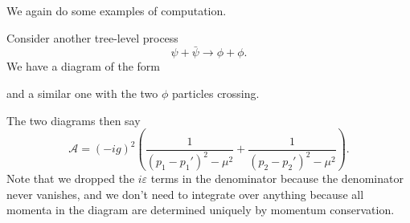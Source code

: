 \documentclass[a4paper]{article}
\begin{document}
We again do some examples of computation.
\begin{eg}
  Consider another tree-level process
  \[
    \psi + \bar{\psi} \to \phi + \phi.
  \]
  We have a diagram of the form
  \begin{center}
  \end{center}
  and a similar one with the two $\phi$ particles crossing.

  The two diagrams then say
  \[
    \mathcal{A} = (-ig)^2 \left(\frac{1}{(p_1 - p_1')^2 - \mu^2} + \frac{1}{(p_2 - p_2')^2 - \mu^2}\right).
  \]
  Note that we dropped the $i\varepsilon$ terms in the denominator because the denominator never vanishes, and we don't need to integrate over anything because all momenta in the diagram are determined uniquely by momentum conservation.
\end{eg}
\end{document}
